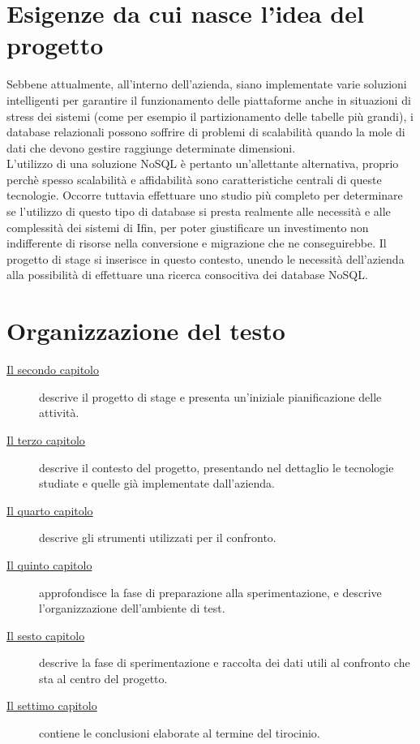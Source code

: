 \section{Esigenze da cui nasce l'idea del progetto}

Sebbene attualmente, all'interno dell'azienda, siano implementate varie soluzioni intelligenti per garantire il funzionamento delle piattaforme anche in situazioni di stress dei sistemi (come per esempio il partizionamento delle tabelle più grandi), i database relazionali possono soffrire di problemi di scalabilità quando la mole di dati che devono gestire raggiunge determinate dimensioni.\\
L'utilizzo di una soluzione NoSQL è pertanto un'allettante alternativa, proprio perchè spesso scalabilità e affidabilità sono caratteristiche centrali di queste tecnologie\cite{site:mongoarticleadvantages}. Occorre tuttavia effettuare uno studio più completo per determinare se l'utilizzo di questo tipo di database si presta realmente alle necessità e alle complessità dei sistemi di Ifin, per poter giustificare un investimento non indifferente di risorse nella conversione e migrazione che ne conseguirebbe.
Il progetto di stage si inserisce in questo contesto, unendo le necessità dell'azienda alla possibilità di effettuare una ricerca consocitiva dei database NoSQL.\\

\section{Organizzazione del testo}

\begin{description}
    \item[{\hyperref[cap:descrizione-stage]{Il secondo capitolo}}] descrive il progetto di stage e presenta un'iniziale pianificazione delle attività.
    
    \item[{\hyperref[cap:contesto]{Il terzo capitolo}}] descrive il contesto del progetto, presentando nel dettaglio le tecnologie studiate e quelle già implementate dall'azienda.
    
    \item[{\hyperref[cap:strumenti]{Il quarto capitolo}}] descrive gli strumenti utilizzati per il confronto.

    \item[{\hyperref[cap:progettazione]{Il quinto capitolo}}] approfondisce la fase di preparazione alla sperimentazione, e descrive l'organizzazione dell'ambiente di test.
    
    \item[{\hyperref[cap:sperimentazione]{Il sesto capitolo}}] descrive la fase di sperimentazione e raccolta dei dati utili al confronto che sta al centro del progetto.
    
    \item[{\hyperref[cap:conclusioni]{Il settimo capitolo}}] contiene le conclusioni elaborate al termine del tirocinio.
\end{description}